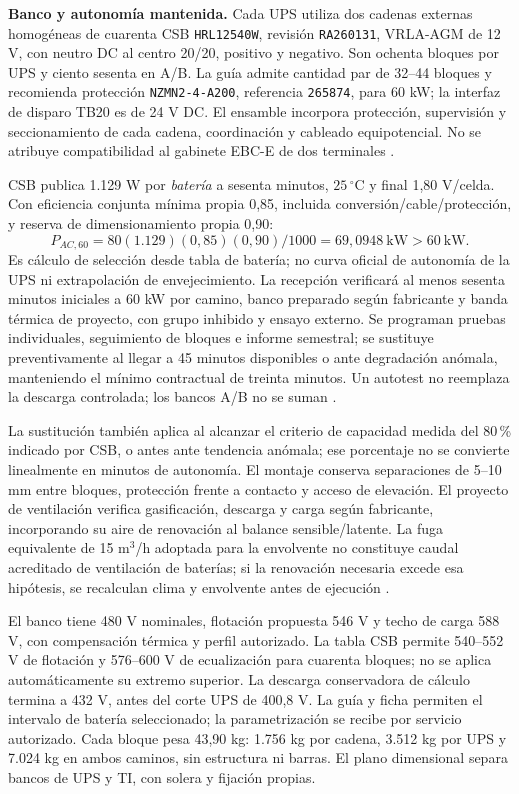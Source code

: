 \textbf{Banco y autonomía mantenida.} Cada UPS utiliza dos cadenas externas homogéneas de cuarenta CSB \texttt{HRL12540W}, revisión \texttt{RA260131}, VRLA-AGM de 12 V, con neutro DC al centro 20/20, positivo y negativo. Son ochenta bloques por UPS y ciento sesenta en A/B. La guía admite cantidad par de 32--44 bloques y recomienda protección \texttt{NZMN2-4-A200}, referencia \texttt{265874}, para 60 kW; la interfaz de disparo TB20 es de 24 V DC. El ensamble incorpora protección, supervisión y seccionamiento de cada cadena, coordinación y cableado equipotencial. No se atribuye compatibilidad al gabinete EBC-E de dos terminales \parencite[pp.~35/49--51]{p7-eaton-93t-guia}.

CSB publica 1.129 W por \emph{batería} a sesenta minutos, $25\,^{\circ}$C y final 1,80 V/celda. Con eficiencia conjunta mínima propia 0,85, incluida conversión/cable/protección, y reserva de dimensionamiento propia 0,90:
\[
P_{AC,60}=80(1.129)(0,85)(0,90)/1000=69,0948\ \mathrm{kW}>60\ \mathrm{kW}.
\]
Es cálculo de selección desde tabla de batería; no curva oficial de autonomía de la UPS ni extrapolación de envejecimiento. La recepción verificará al menos sesenta minutos iniciales a 60 kW por camino, banco preparado según fabricante y banda térmica de proyecto, con grupo inhibido y ensayo externo. Se programan pruebas individuales, seguimiento de bloques e informe semestral; se sustituye preventivamente al llegar a 45 minutos disponibles o ante degradación anómala, manteniendo el mínimo contractual de treinta minutos. Un autotest no reemplaza la descarga controlada; los bancos A/B no se suman \parencites[pp.~1--2]{csbHRL12540WRA260131}[RT-06.07/10, p.~15]{pucv-transversal}{csbManualJunio2025}.

La sustitución también aplica al alcanzar el criterio de capacidad medida del 80\,\% indicado por CSB, o antes ante tendencia anómala; ese porcentaje no se convierte linealmente en minutos de autonomía. El montaje conserva separaciones de 5--10 mm entre bloques, protección frente a contacto y acceso de elevación. El proyecto de ventilación verifica gasificación, descarga y carga según fabricante, incorporando su aire de renovación al balance sensible/latente. La fuga equivalente de 15 m$^3$/h adoptada para la envolvente no constituye caudal acreditado de ventilación de baterías; si la renovación necesaria excede esa hipótesis, se recalculan clima y envolvente antes de ejecución \parencite{csbManualJunio2025}.

El banco tiene 480 V nominales, flotación propuesta 546 V y techo de carga 588 V, con compensación térmica y perfil autorizado. La tabla CSB permite 540--552 V de flotación y 576--600 V de ecualización para cuarenta bloques; no se aplica automáticamente su extremo superior. La descarga conservadora de cálculo termina a 432 V, antes del corte UPS de 400,8 V. La guía y ficha permiten el intervalo de batería seleccionado; la parametrización se recibe por servicio autorizado. Cada bloque pesa 43,90 kg: 1.756 kg por cadena, 3.512 kg por UPS y 7.024 kg en ambos caminos, sin estructura ni barras. El plano dimensional separa bancos de UPS y TI, con solera y fijación propias.

